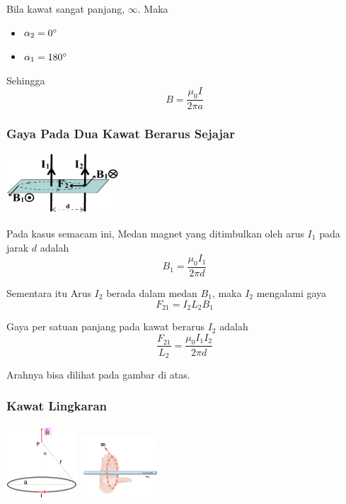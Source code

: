 \documentclass[twocolumn, 11pt]{article}%
\begin{document}
Bila kawat sangat panjang, $\infty$. Maka
\begin{itemize}
    \item $\alpha_2 =0\degree$
    \item $\alpha_1 =180\degree$
\end{itemize}

Sehingga
\[B=\frac{\mu_0 I}{2\pi a} \]

\subsubsection{Gaya Pada Dua Kawat Berarus Sejajar}%
\begin{center}
    \includegraphics[width=160px]{6.png}
\end{center}

Pada kasus semacam ini, Medan magnet yang ditimbulkan oleh arus $I_1$
pada jarak $d$ adalah
\[B_1=\frac{\mu_0 I_1}{2\pi d} \]

Sementara itu Arus $I_2$ berada dalam medan $B_1$, maka $I_2$ mengalami gaya
\[ F_{21} = I_2 L_2 B_1 \]

Gaya per satuan panjang pada kawat berarus $I_2$ adalah
\[\frac{F_{21}}{L_2} =\frac{\mu_0 I_1I_2}{2\pi d} \]

Arahnya bisa dilihat pada gambar di atas.

\subsubsection{Kawat Lingkaran}%
\begin{center}
    \includegraphics[width=100px]{7.png}
    \includegraphics[width=110px]{5.png}
\end{center}
\end{document}

